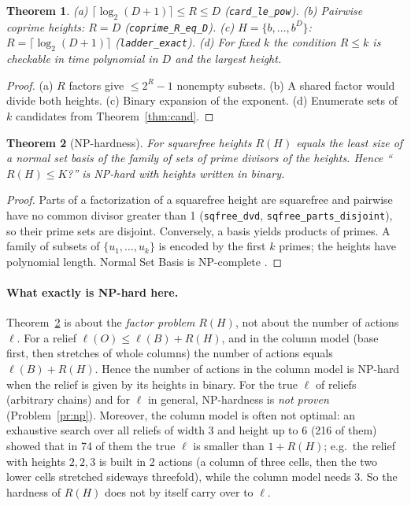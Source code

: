 \documentclass[11pt,a4paper]{article}
\theoremstyle{plain}
\newtheorem{theorem}{Theorem}[section]
\theoremstyle{definition}
\theoremstyle{remark}
\newcommand{\lean}[1]{\texttt{#1}}
\begin{document}
\begin{theorem}\label{thm:R}
(a) $\lceil\log_2(D+1)\rceil\le R\le D$ (\lean{card\_le\_pow}). (b) Pairwise coprime heights: $R=D$ (\lean{coprime\_R\_eq\_D}). (c) $H=\{b,\dots,b^D\}$: $R=\lceil\log_2(D+1)\rceil$ (\lean{ladder\_exact}). (d) For fixed $k$ the condition $R\le k$ is checkable in time polynomial in $D$ and the largest height.
\end{theorem}
\begin{proof}
(a) $R$ factors give $\le2^R-1$ nonempty subsets. (b) A shared factor would divide both heights. (c) Binary expansion of the exponent. (d) Enumerate sets of $k$ candidates from Theorem~\ref{thm:cand}.
\end{proof}

\begin{theorem}[NP-hardness]\label{thm:np}
For squarefree heights $R(H)$ equals the least size of a normal set basis of the family of sets of prime divisors of the heights. Hence ``$R(H)\le K$?'' is NP-hard with heights written in binary.
\end{theorem}
\begin{proof}
Parts of a factorization of a squarefree height are squarefree and pairwise have no common divisor greater than 1 (\lean{sqfree\_dvd}, \lean{sqfree\_parts\_disjoint}), so their prime sets are disjoint. Conversely, a basis yields products of primes. A family of subsets of $\{u_1,\dots,u_k\}$ is encoded by the first $k$ primes; the heights have polynomial length. Normal Set Basis is NP-complete \cite{jiang}.
\end{proof}

\paragraph{What exactly is NP-hard here.} Theorem~\ref{thm:np} is about the \emph{factor problem} $R(H)$, not about the number of actions $\ell$. For a relief $\ell(O)\le\ell(B)+R(H)$, and in the column model (base first, then stretches of whole columns) the number of actions equals $\ell(B)+R(H)$. Hence the number of actions in the column model is NP-hard when the relief is given by its heights in binary. For the true $\ell$ of reliefs (arbitrary chains) and for $\ell$ in general, NP-hardness is \emph{not proven} (Problem~\ref{pr:np}). Moreover, the column model is often not optimal: an exhaustive search over all reliefs of width 3 and height up to 6 (216 of them) showed that in 74 of them the true $\ell$ is smaller than $1+R(H)$; e.g.\ the relief with heights $2,2,3$ is built in 2 actions (a column of three cells, then the two lower cells stretched sideways threefold), while the column model needs 3. So the hardness of $R(H)$ does not by itself carry over to $\ell$.
\end{document}
